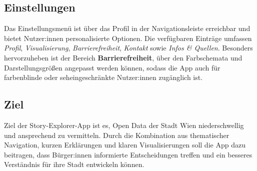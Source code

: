 \subsection{Einstellungen}
%
\noindent
Das Einstellungsmenü ist über das Profil in der Navigationsleiste erreichbar und bietet Nutzer:innen personalisierte Optionen.
Die verfügbaren Einträge umfassen \textit{Profil}, \textit{Visualisierung}, \textit{Barrierefreiheit}, \textit{Kontakt} sowie \textit{Infos \& Quellen}.
Besonders hervorzuheben ist der Bereich \textbf{Barrierefreiheit}, über den Farbschemata und Darstellungsgrößen angepasst werden können, sodass die App auch für farbenblinde oder seheingeschränkte Nutzer:innen zugänglich ist.
%
\subsection{Ziel}
%
\noindent
Ziel der Story-Explorer-App ist es, Open Data der Stadt Wien niederschwellig und ansprechend zu vermitteln.
Durch die Kombination aus thematischer Navigation, kurzen Erklärungen und klaren Visualisierungen soll die App dazu beitragen, dass Bürger:innen informierte Entscheidungen treffen und ein besseres Verständnis für ihre Stadt entwickeln können.

